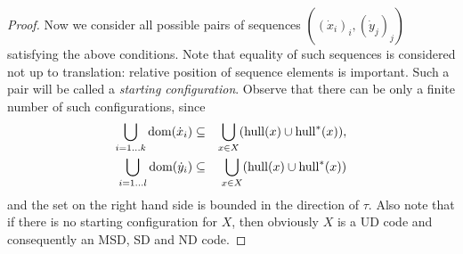 \documentclass[final,nomarks]{dmtcs-episciences}
\newcommand{\dfdomain}[1]{\mbox{\rm dom}(#1)}
\newcommand{\hull}[1]{\mathrm{hull}(#1)}\newcommand{\hullm}[1]{\mathrm{hull}^{*}(#1)}\newcommand{\block}{{\mathrm B}_0}\newcommand{\rblock}{{\mathrm B}_{\mathrm R}}\newcommand{\lblock}{{\mathrm B}_{\mathrm L}}
\newcommand{\dx}{\dot{x}}
\newcommand{\dy}{\dot{y}}
\begin{document}
\begin{proof}
Now we consider all possible pairs of sequences $((\dx_i)_i,(\dy_j)_j)$ satisfying the above
conditions. Note that equality of such sequences is considered not up to translation: 
relative position of sequence elements is important. Such a pair will be called a
\emph{starting configuration}. Observe that there can be only a finite number of such
 configurations, since
\begin{eqnarray*}
 \bigcup_{i=1\ldots k}\dfdomain{\dx_i} & \subseteq & \bigcup_{x\in X} (\hull{x}\cup\hullm{x}),\\
 \bigcup_{i=1\ldots l}\dfdomain{\dy_i} & \subseteq & \bigcup_{x\in X} (\hull{x}\cup\hullm{x})
\end{eqnarray*}
and the set on the right hand side is bounded in the direction of $\tau$.
Also note that if there is no starting configuration for $X$, then obviously $X$ is a 
UD code and consequently an MSD, SD and ND code.



\end{proof}
\end{document}
